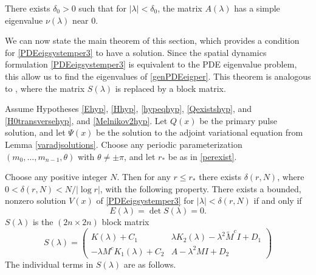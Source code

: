 \documentclass[thesis.tex]{subfiles}
\begin{document}
\begin{lemma}\label{nulambdalemmasimple}
There exists $\delta_0 > 0$ such that for $|\lambda| < \delta_0$, the matrix $A(\lambda)$ has a simple eigenvalue $\nu(\lambda)$ near 0.
\end{lemma}

We can now state the main theorem of this section, which provides a condition for \cref{PDEeigsystemper3} to have a solution. Since the spatial dynamics formulation \cref{PDEeigsystemper3} is equivalent to the PDE eigenvalue problem, this allow us to find the eigenvalues of \cref{genPDEeigper}. This theorem is analogous to \cite[Theorem 2]{Sandstede1998}, where the matrix $S(\lambda)$ is replaced by a block matrix.

\begin{theorem}\label{blockmatrixtheorem}
Assume Hypotheses \ref{Ehyp}, \ref{Hhyp}, \ref{hypeqhyp}, \ref{Qexistshyp}, and \ref{H0transversehyp}, and \ref{Melnikov2hyp}. Let $Q(x)$ be the primary pulse solution, and let $\Psi(x)$ be the solution to the adjoint variational equation from Lemma \ref{varadjsolutions}. Choose any periodic parameterization $(m_0, \dots, m_{n-1}, \theta)$ with $\theta \neq \pm \pi$, and let $r_*$ be as in \cref{perexist}. 

Choose any positive integer $N$. Then for any $r \leq r_*$ there exists $\delta(r,N)$, where $0 < \delta(r,N) < N/|\log r|$, with the following property. There exists a bounded, nonzero solution $V(x)$ of \cref{PDEeigsystemper3} for $|\lambda| < \delta(r,N)$ if and only if
\begin{equation}\label{blockmatrixcond}
E(\lambda) = \det S(\lambda) = 0.
\end{equation}
$S(\lambda)$ is the $(2n \times 2n)$ block matrix
\begin{equation}\label{blockeq}
S(\lambda) = 
\begin{pmatrix}
K(\lambda) + C_1 & \lambda K_2(\lambda) - \lambda^2 \tilde{M}^c I + D_1 \\
-\lambda M^c K_1(\lambda) + C_2 & A - \lambda^2 MI + D_2
\end{pmatrix}
\end{equation}
The individual terms in $S(\lambda)$ are as follows.


\end{theorem}
\end{document}
